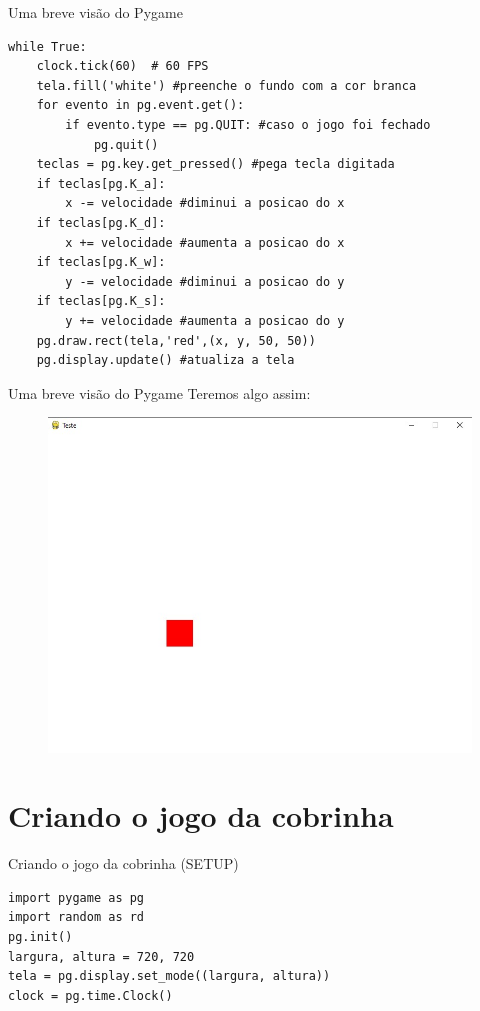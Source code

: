 \documentclass[fleqn,utf8,aspectratio=169,14pt]{beamer}
\begin{document}
	\begin{frame}[fragile]{Uma breve visão do Pygame}
		\begin{lstlisting}
while True:
	clock.tick(60)  # 60 FPS
	tela.fill('white') #preenche o fundo com a cor branca
	for evento in pg.event.get():
		if evento.type == pg.QUIT: #caso o jogo foi fechado
			pg.quit()
	teclas = pg.key.get_pressed() #pega tecla digitada
	if teclas[pg.K_a]:
		x -= velocidade #diminui a posicao do x
	if teclas[pg.K_d]:
		x += velocidade #aumenta a posicao do x
	if teclas[pg.K_w]:
		y -= velocidade #diminui a posicao do y
	if teclas[pg.K_s]:
		y += velocidade #aumenta a posicao do y
	pg.draw.rect(tela,'red',(x, y, 50, 50))
	pg.display.update() #atualiza a tela	
		\end{lstlisting}
	\end{frame}
	
	\begin{frame}{Uma breve visão do Pygame}
		Teremos algo assim:
		
		\begin{figure}
			\centering
			\includegraphics[width=0.7\linewidth]{Imagem8}
			\caption{}
			\label{fig:imagem8}
		\end{figure}
		
	\end{frame}
	
	\section{Criando o jogo da cobrinha}
	\begin{frame}[fragile]{Criando o jogo da cobrinha (SETUP)}
		
		\begin{lstlisting}
import pygame as pg
import random as rd
pg.init()
largura, altura = 720, 720
tela = pg.display.set_mode((largura, altura))
clock = pg.time.Clock()

		\end{lstlisting}
	\end{frame}
	
\end{document}
